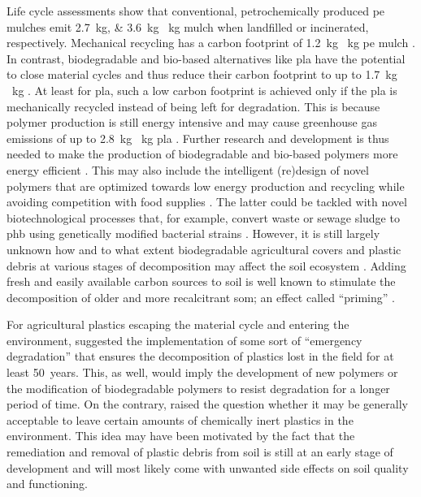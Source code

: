 Life cycle assessments show that conventional, petrochemically produced \ac{pe} mulches emit \SIlist{2.7;3.6}{\kilo\gram}\,\,\si{\per\kilo\gram} mulch when landfilled or incinerated, respectively. Mechanical recycling has a carbon footprint of \SI{1.2}{\kilo\gram}  \si{\per\kilo\gram} \ac{pe} mulch \citep{BosLife2008}. In contrast, biodegradable and bio-based alternatives like \ac{pla} have the potential to close material cycles and thus reduce their carbon footprint to up to \SI{1.7}{\kilo\gram}\,\,\si{\per\kilo\gram} \citep{KollerSwitching2019,RezvaniGhomiLife2021}. At least for \ac{pla}, such a low carbon footprint is achieved only if the \ac{pla} is mechanically recycled instead of being left for degradation. This is because polymer production is still energy intensive and may cause greenhouse gas emissions of up to \SI{2.8}{\kilo\gram}\,\,\si{\per\kilo\gram} \ac{pla} \citep{RezvaniGhomiLife2021,AltmanMyth2021}. Further research and development is thus needed to make the production of biodegradable and bio-based polymers more energy efficient \citep{VieraAre2021}. This may also include the intelligent (re)design of novel polymers that are optimized towards low energy production and recycling \citep{VieraAre2021,KorleyPolymer2021,KakadellisAchieving2021} while avoiding competition with food supplies \citep{RhodesPlastic2018}. The latter could be tackled with novel biotechnological processes that, for example, convert waste or sewage sludge to \ac{phb} using genetically modified bacterial strains \citep{LeongWaste2021}.
However, it is still largely unknown how and to what extent biodegradable agricultural covers and plastic debris at various stages of decomposition may affect the soil ecosystem \citep{SanderBiodegradation2019,QinReview2021,AltmanMyth2021}. Adding fresh and easily available carbon sources to soil is well known to stimulate the decomposition of older and more recalcitrant \ac{som}; an effect called ``priming'' \citep{ChenMixing2020}.

For agricultural plastics escaping the material cycle and entering the environment, \citet{BertlingKunststoffe2021} suggested the implementation of some sort of ``emergency degradation'' that ensures the decomposition of plastics lost in the field for at least \SI{50}{years}. This, as well, would imply the development of new polymers or the modification of biodegradable polymers to resist degradation for a longer period of time. On the contrary, \citet{ScalengheResource2018} raised the question whether it may be generally acceptable to leave certain amounts of chemically inert plastics in the environment. This idea may have been motivated by the fact that the remediation and removal of plastic debris from soil is still at an early stage of development \citep{PadervandRemoval2020} and will most likely come with unwanted side effects on soil quality and functioning.

